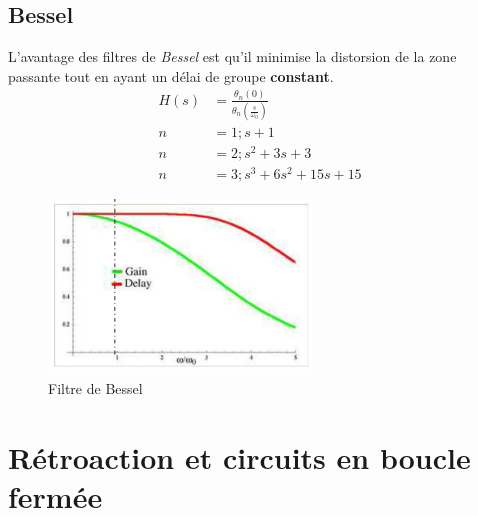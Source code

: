 \documentclass{report}
\begin{document}
\subsection{Bessel}
L'avantage des filtres de \textit{Bessel} est qu'il minimise la distorsion de la zone passante tout en ayant un délai de groupe \textbf{constant}.
\begin{align*}
H(s) &= \frac{\theta_n (0) }{\theta_n (\frac{s}{\omega_0 })}\\
n &= 1; s+1\\
n &= 2; s^2 + 3s + 3\\
n &= 3; s^3 + 6 s^2 + 15s + 15
\end{align*}
\begin{figure}[H]
\centering
\includegraphics[width=7cm]{img/Bessel.png}
\caption{Filtre de Bessel}
\end{figure}

\section{Rétroaction et circuits en boucle fermée}
\end{document}
